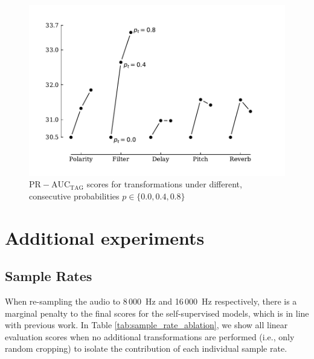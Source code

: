 \begin{figure}[h]
    \centering
    \includegraphics[width=\columnwidth]{figs/transformation_probabilities.pdf}
    \caption[-5cm]{$\mathrm{PR-AUC}_{\mathrm{TAG}}$ scores for transformations under different, consecutive probabilities $p \in \{ 0.0, 0.4, 0.8 \}$}
    \label{fig:transformation_probabilities}
\end{figure}





\section{Additional experiments}
\subsection{Sample Rates}    
When re-sampling the audio to 8\,000~Hz and 16\,000~Hz respectively, there is a marginal penalty to the final scores for the self-supervised models, which is in line with previous work\cite{lee2018samplecnn}. In Table \ref{tab:sample_rate_ablation}, we show all linear evaluation scores when no additional transformations are performed (i.e., only random cropping) to isolate the contribution of each individual sample rate.


